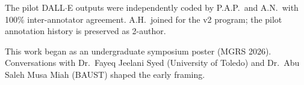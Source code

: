 \documentclass[sigconf,nonacm]{acmart}
\begin{document}
The pilot DALL$\cdot$E outputs were independently coded by P.A.P.\ and A.N.\ with 100\% inter-annotator agreement. A.H.\ joined for the v2 program; the pilot annotation history is preserved as 2-author.

\begin{acks}
This work began as an undergraduate symposium poster (MGRS 2026). Conversations with Dr.\ Fayeq Jeelani Syed (University of Toledo) and Dr.\ Abu Saleh Musa Miah (BAUST) shaped the early framing.
\end{acks}



\end{document}
